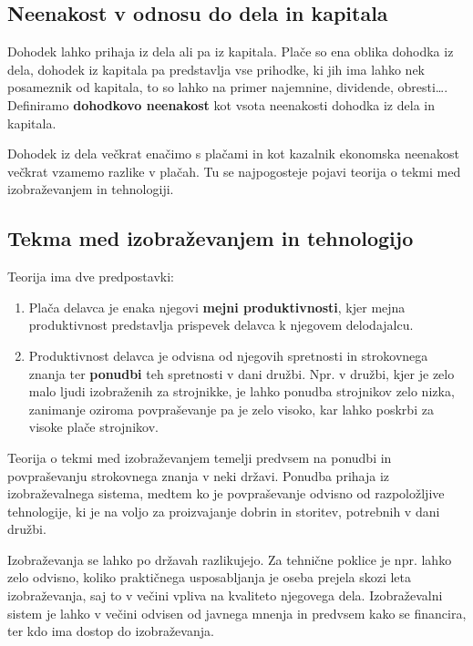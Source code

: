 \documentclass[a4paper,12 pt]{article}
\begin{document}
\subsection[Neenakost v odnosu do dela in kapitala]{Neenakost v odnosu do dela in kapitala}

Dohodek lahko prihaja iz dela ali pa iz kapitala. Plače so ena oblika dohodka iz dela, dohodek iz kapitala pa predstavlja vse prihodke, ki jih ima lahko nek posameznik od kapitala, to so lahko na primer najemnine, dividende, obresti\dots. Definiramo \textbf{dohodkovo neenakost} kot vsota neenakosti dohodka iz dela in kapitala.

Dohodek iz dela večkrat enačimo s plačami in kot kazalnik ekonomska neenakost večkrat vzamemo razlike v plačah. Tu se najpogosteje pojavi teorija o tekmi med izobraževanjem in tehnologiji.

\subsection[Tekma med izobraževanjem in tehnologijo]{Tekma med izobraževanjem in tehnologijo}

Teorija ima dve predpostavki:
\begin{enumerate}
\item Plača delavca je enaka njegovi \textbf{mejni produktivnosti}, kjer mejna produktivnost predstavlja prispevek delavca k njegovem delodajalcu.
\item Produktivnost delavca je odvisna od njegovih spretnosti in strokovnega znanja ter \textbf{ponudbi} teh spretnosti v dani družbi. Npr. v družbi, kjer je zelo malo ljudi izobraženih za strojnikke, je lahko ponudba strojnikov zelo nizka, zanimanje oziroma povpraševanje pa je zelo visoko, kar lahko poskrbi za visoke plače strojnikov.
\end{enumerate}

Teorija o tekmi med izobraževanjem temelji predvsem na ponudbi in povpraševanju strokovnega znanja v neki državi. Ponudba prihaja iz izobraževalnega sistema, medtem ko je povpraševanje odvisno od razpoložljive tehnologije, ki je na voljo za proizvajanje dobrin in storitev, potrebnih v dani družbi. 

Izobraževanja se lahko po državah razlikujejo. Za tehnične poklice je npr. lahko zelo odvisno, koliko praktičnega usposabljanja je oseba prejela skozi leta izobraževanja, saj to v večini vpliva na kvaliteto njegovega dela. Izobraževalni sistem je lahko v večini odvisen od javnega mnenja in predvsem kako se financira, ter kdo ima dostop do izobraževanja.
\end{document}
